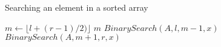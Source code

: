 \documentclass[12pt]{article}
\begin{document}
\begin{algorithm}

  \caption{Searching an element in a sorted array}
  
\begin{algorithmic}[1]
	\Statex
		\State $m \gets \lfloor l + (r-1) / 2) \rfloor$
			\State \Return $m$
		\EndIf
			\State \Return $BinarySearch(A,l,m-1,x)$
		\Else
			\State \Return $BinarySearch(A,m+1,r,x)$
		\EndIf
	\EndIf
\EndProcedure
\end{algorithmic}

\end{algorithm}
  
\end{document}

